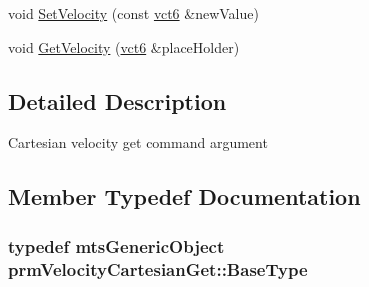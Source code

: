 {\bf }\par
\begin{DoxyCompactItemize}
\item 
void \hyperlink{classprm_velocity_cartesian_get_a140fd61c69c82eb8fc2884f6910d3eb0}{Set\-Velocity} (const \hyperlink{vct_fixed_size_vector_types_8h_abb9fb64cb9696edc946e57a342b9033a}{vct6} \&new\-Value)
\item 
void \hyperlink{classprm_velocity_cartesian_get_a8d605e9ee20a31e03cd5d3454fc73cb8}{Get\-Velocity} (\hyperlink{vct_fixed_size_vector_types_8h_abb9fb64cb9696edc946e57a342b9033a}{vct6} \&place\-Holder)
\end{DoxyCompactItemize}



\subsection{Detailed Description}
Cartesian velocity get command argument 

\subsection{Member Typedef Documentation}
\hypertarget{classprm_velocity_cartesian_get_a49e1fbc1e4ec5d09b4a9660564a1b547}{
\subsubsection[{Base\-Type}]{\setlength{\rightskip}{0pt plus 5cm}typedef {\bf mts\-Generic\-Object} {\bf prm\-Velocity\-Cartesian\-Get\-::\-Base\-Type}}}\label{classprm_velocity_cartesian_get_a49e1fbc1e4ec5d09b4a9660564a1b547}



